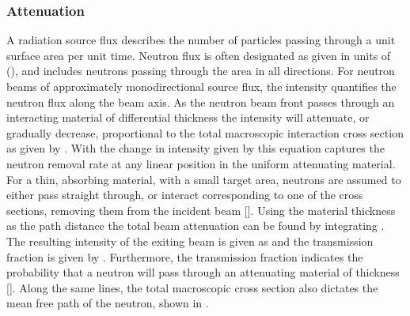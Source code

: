 \documentclass[../../../../main.tex]{subfiles}
\begin{document}
    \subsubsection{Attenuation}%
    \label{sec:chapter-2:radiation-detection:neutron-interactions:attenuation}%
    A radiation source flux describes the number of particles passing through a unit surface area per unit time.
    Neutron flux is often designated as \Xvariable{\phi} given in units of (\si{\neutronflux}), and includes neutrons passing through the area in all directions.
    For neutron beams of approximately monodirectional source flux, the intensity  quantifies the neutron flux along the beam axis.
    As the neutron beam front passes through an interacting material of differential thickness  the intensity will attenuate, or gradually decrease, proportional to the total macroscopic interaction cross section  as given by .
    With the change in intensity given by  this equation captures the neutron removal rate at any linear position  in the uniform attenuating material.
    For a thin, absorbing material, with a small target area, neutrons are assumed to either pass straight through, or interact corresponding to one of the cross sections, removing them from the incident beam [].
    Using the material thickness as the path distance  the total beam attenuation can be found by integrating . 
    The resulting intensity of the exiting beam is given as  and the transmission fraction  is given by .
    Furthermore, the transmission fraction indicates the probability that a neutron will pass through an attenuating material of thickness [].
    Along the same lines, the total macroscopic cross section also dictates the mean free path \Xvariable{\lambda} of the neutron, shown in .
\end{document}
